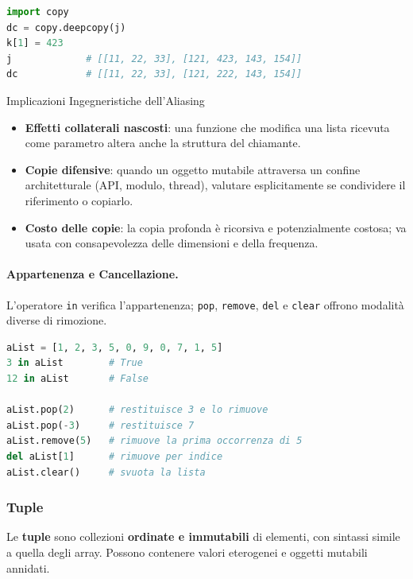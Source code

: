 \documentclass[12pt]{extarticle}
\begin{document}
\begin{lstlisting}[language=Python]
import copy
dc = copy.deepcopy(j)
k[1] = 423
j             # [[11, 22, 33], [121, 423, 143, 154]]
dc            # [[11, 22, 33], [121, 222, 143, 154]]
\end{lstlisting}

\begin{cbox}{Implicazioni Ingegneristiche dell'Aliasing}
\begin{itemize}
    \item \textbf{Effetti collaterali nascosti}: una funzione che modifica una lista ricevuta come parametro altera anche la struttura del chiamante.
    \item \textbf{Copie difensive}: quando un oggetto mutabile attraversa un confine architetturale (API, modulo, thread), valutare esplicitamente se condividere il riferimento o copiarlo.
    \item \textbf{Costo delle copie}: la copia profonda è ricorsiva e potenzialmente costosa; va usata con consapevolezza delle dimensioni e della frequenza.
\end{itemize}
\end{cbox}

\paragraph{Appartenenza e Cancellazione.} L'operatore \texttt{in} verifica l'appartenenza; \texttt{pop}, \texttt{remove}, \texttt{del} e \texttt{clear} offrono modalità diverse di rimozione.

\begin{lstlisting}[language=Python]
aList = [1, 2, 3, 5, 0, 9, 0, 7, 1, 5]
3 in aList        # True
12 in aList       # False

aList.pop(2)      # restituisce 3 e lo rimuove
aList.pop(-3)     # restituisce 7
aList.remove(5)   # rimuove la prima occorrenza di 5
del aList[1]      # rimuove per indice
aList.clear()     # svuota la lista
\end{lstlisting}

\subsubsection{Tuple}

\noindent Le \textbf{tuple} sono collezioni \textbf{ordinate e immutabili} di elementi, con sintassi simile a quella degli array. Possono contenere valori eterogenei e oggetti mutabili annidati.
\end{document}

